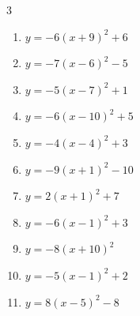 \begin{multicols}{3}
\begin{enumerate}
  \item $\displaystyle y=-6\left( x+9\right)^{2}+6$

        \phantom{$\displaystyle 頂点\left( -9 , 6 \right)$}

  \item $\displaystyle y=-7\left( x-6\right)^{2}-5$

        \phantom{$\displaystyle 頂点\left( 6 , -5 \right)$}

  \item $\displaystyle y=-5\left( x-7\right)^{2}+1$

        \phantom{$\displaystyle 頂点\left( 7 , 1 \right)$}

  \item $\displaystyle y=-6\left( x-10\right)^{2}+5$

        \phantom{$\displaystyle 頂点\left( 10 , 5 \right)$}

  \item $\displaystyle y=-4\left( x-4\right)^{2}+3$

        \phantom{$\displaystyle 頂点\left( 4 , 3 \right)$}

\columnbreak %

  \item $\displaystyle y=-9\left( x+1\right)^{2}-10$

        \phantom{$\displaystyle 頂点\left( -1 , -10 \right)$}

  \item $\displaystyle y=2\left( x+1\right)^{2}+7$

        \phantom{$\displaystyle 頂点\left( -1 , 7 \right)$}

  \item $\displaystyle y=-6\left( x-1\right)^{2}+3$

        \phantom{$\displaystyle 頂点\left( 1 , 3 \right)$}

  \item $\displaystyle y=-8\left( x+10\right)^{2}$

        \phantom{$\displaystyle 頂点\left( -10 , 0 \right)$}

  \item $\displaystyle y=-5\left( x-1\right)^{2}+2$

        \phantom{$\displaystyle 頂点\left( 1 , 2 \right)$}

  \item $\displaystyle y=8\left( x-5\right)^{2}-8$

        \phantom{$\displaystyle 頂点\left( 5 , -8 \right)$}


\end{enumerate}
\end{multicols}
